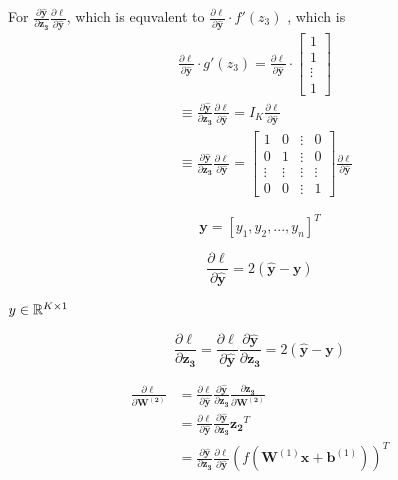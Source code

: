 For $\frac{\partial \bm{\hat y}}{\partial \bm{z_3}}\frac{\partial \ell}{\partial \bm{\hat y}}$, which is equvalent to $\frac{\partial \ell}{\partial \bm{\hat y}} \cdot f'(z_3)$ , which is
\begin{align}
    &\frac{\partial \ell}{\partial \bm{\hat y}} \cdot g'(z_3)
= \frac{\partial \ell}{\partial \bm{\hat y}} \cdot     
\left[
    \begin{array}{c}
        1 \\
        1 \\
        \vdots \\
        1
    \end{array}
\right] \\
&\equiv \frac{\partial \bm{\hat y}}{\partial \bm{z_3}}\frac{\partial \ell}{\partial \bm{\hat y}} = I_{K} \frac{\partial \ell}{\partial \bm{\hat y}}\\
&\equiv  \frac{\partial \bm{\hat y}}{\partial \bm{z_3}}  \frac{\partial \ell}{\partial \bm{\hat y}}
= \left[
    \begin{array}{cccc}
        1 & 0 & \vdots & 0 \\
        0 & 1 & \vdots & 0 \\
        \vdots & \vdots & \vdots & \vdots \\
        0 & 0 & \vdots & 1 
    \end{array}
\right] \frac{\partial \ell}{\partial \bm{\hat y}}
\end{align}



\begin{equation}
    \bm{y} = [y_1, y_2, ..., y_n]^T
\end{equation}

\begin{equation}
    \frac{\partial \ell}{\partial \bm{\hat y}} = 2( \bm{\hat{y}} - \bm{y})
\end{equation}

$y \in \mathbb{R}^{K \times 1}$

\begin{equation}
    \frac{\partial \ell}{\partial \bm{z_3}} = \frac{\partial \ell}{\partial \bm{\hat y}} \frac{\partial \bm{\hat y}}{\partial \bm{z_3}} = 2( \bm{\hat{y}} - \bm{y})
\end{equation}


\begin{align}
    \frac{\partial \ell}{\partial \bm{W^{(2)}}} 
    &= \frac{\partial \ell}{\partial \bm{\hat y}} \frac{\partial \bm{\hat y}}{\partial \bm{z_3}} \frac{\partial \bm{z_3}}{\partial \bm{W^{(2)}}}  \\
    &= \frac{\partial \ell}{\partial \bm{\hat y}} \frac{\partial \bm{\hat y}}{\partial \bm{z_3}} \bm{z_2}^T \\
    &= \frac{\partial \bm{\hat y}}{\partial \bm{z_3}} \frac{\partial \ell}{\partial \bm{\hat y}}  (f(\bm{W}^{(1)}\bm{x} + \bm{b}^{(1)}))^T \\
\end{align}

